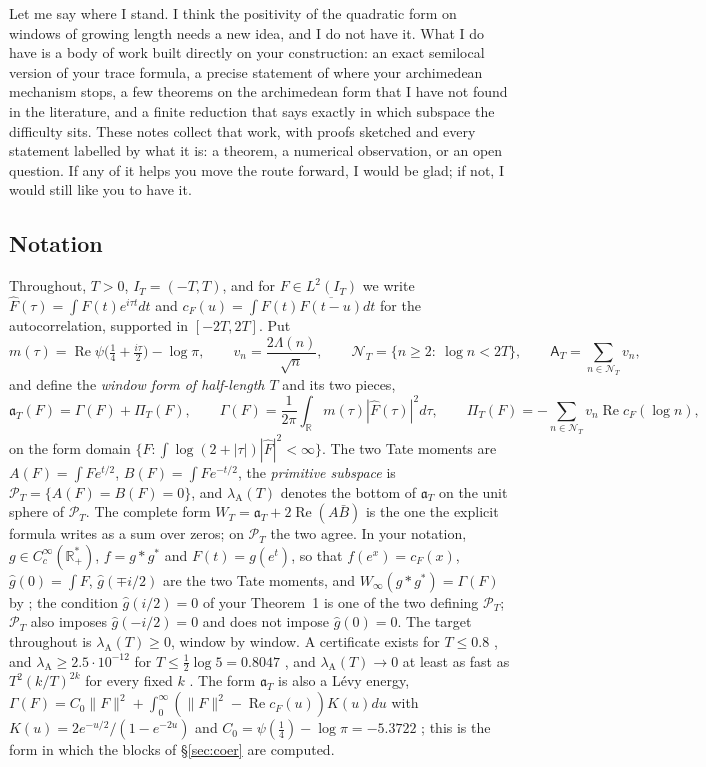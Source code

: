 \documentclass[11pt]{amsart}
\theoremstyle{definition}
\theoremstyle{remark}
\newcommand{\R}{\mathbb R}
\newcommand{\Rel}{\operatorname{Re}}
\newcommand{\IT}{I_T}
\newcommand{\PT}{\mathcal P_T}
\newcommand{\Fh}{\widehat F}
\newcommand{\cF}{c_F}
\newcommand{\NT}{\mathcal N_T}
\newcommand{\Aconst}{\mathsf A_T}
\newcommand{\PiT}{\Pi_T}
\newcommand{\lamA}{\lambda_{\mathrm A}}
\begin{document}
Let me say where I stand. I think the positivity of the quadratic form on windows of
growing length needs a new idea, and I do not have it. What I do have is a body of
work built directly on your construction: an exact semilocal version of your trace formula, a precise
statement of where your archimedean mechanism stops, a few theorems on the archimedean form that I have
not found in the literature, and a finite reduction that says exactly in which subspace the difficulty
sits. These notes collect that work, with proofs sketched and every statement labelled by what it is: a
theorem, a numerical observation, or an open question. If any of it helps you move the route forward, I
would be glad; if not, I would still like you to have it.

\subsection*{Notation}
Throughout, $T>0$, $\IT=(-T,T)$, and for $F\in L^2(\IT)$ we write $\Fh(\tau)=\int F(t)e^{i\tau t}dt$ and
$\cF(u)=\int F(t)\overline{F(t-u)}dt$ for the autocorrelation, supported in $[-2T,2T]$. Put
\[
m(\tau)=\Rel\psi\big(\tfrac14+\tfrac{i\tau}2\big)-\log\pi,\qquad v_n=\frac{2\Lambda(n)}{\sqrt n},\qquad
\NT=\{n\ge2:\ \log n<2T\},\qquad \Aconst=\sum_{n\in\NT}v_n,
\]
and define the \emph{window form of half-length $T$} and its two pieces,
\begin{equation}\label{eq:form}
\mathfrak a_T(F)=\Gamma(F)+\PiT(F),\qquad
\Gamma(F)=\frac1{2\pi}\int_\R m(\tau)|\Fh(\tau)|^2d\tau,\qquad
\PiT(F)=-\sum_{n\in\NT}v_n\Rel\cF(\log n),
\end{equation}
on the form domain $\{F:\int\log(2+|\tau|)|\Fh|^2<\infty\}$. The two Tate moments are
$A(F)=\int Fe^{t/2}$, $B(F)=\int Fe^{-t/2}$, the \emph{primitive subspace} is $\PT=\{A(F)=B(F)=0\}$, and
$\lamA(T)$ denotes the bottom of $\mathfrak a_T$ on the unit sphere of $\PT$. The complete form
$W_T=\mathfrak a_T+2\Rel(A\bar B)$ is the one the explicit formula writes as a sum over zeros; on $\PT$ the
two agree. In your notation, $g\in C_c^\infty(\R_+^*)$, $f=g*g^*$ and $F(t)=g(e^t)$, so that $f(e^x)=\cF(x)$,
$\widehat g(0)=\int F$, $\widehat g(\mp i/2)$ are the two Tate moments, and $W_\infty(g*g^*)=\Gamma(F)$ by
\cite[(152)--(154)]{CC2021}; the condition $\widehat g(i/2)=0$ of your Theorem~1 is one of the two defining $\PT$; $\PT$ also imposes $\widehat g(-i/2)=0$ and does not impose $\widehat g(0)=0$. The target throughout is $\lamA(T)\ge0$, window by window.
A certificate exists for $T\le0.8$ \cite{Zhu2026}, and $\lamA\ge2.5\cdot10^{-12}$ for
$T\le\frac12\log5=0.8047$ \cite[\S15]{Paper47}, and $\lamA(T)\to0$ at least as fast as
$T^2(k/T)^{2k}$ for every fixed $k$ \cite[Thm.~11.5]{Paper47}. The form $\mathfrak a_T$ is also a L\'evy
energy, $\Gamma(F)=C_0\|F\|^2+\int_0^\infty(\|F\|^2-\Rel\cF(u))K(u)du$ with
$K(u)=2e^{-u/2}/(1-e^{-2u})$ and $C_0=\psi(\frac14)-\log\pi=-5.3722$ \cite[\S2]{Paper47}; this
is the form in which the blocks of \S\ref{sec:coer} are computed.
\end{document}
